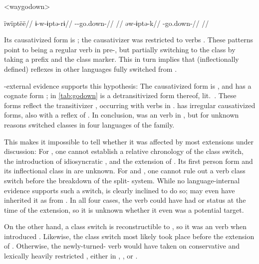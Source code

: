 \pex<waygodown>\wayana \parencite[][200]{wayanatavares2005}
\begin{multicols}{2}
\begingl
\glpreamble ïwïptëë//
\gla ɨ-w-ɨptə-rɨ//
\glb {}--go.down-//
\glft {}//
\endgl
{}
\begingl
\gla əw-ɨptə-k//
\glb {}-go.down-//
\glft {}//
\endgl
\end{multicols}
\xe
%
Its causativized form is  \parencite[255]{wayanatavares2005}; the \PC  causativizer  was restricted to  verbs \parencite{gildea2019overview}.
These patterns point to  being a regular  verb in pre-\wayana, but partially switching to the  class by taking a  prefix and the  class marker.
This in turn implies that (inflectionally defined)  reflexes in other languages fully switched from .

\wayana-external evidence supports this hypothesis:
The \arara causativized form is  \parencite[66]{alves2017arara}, and \kalina has a cognate form  \parencite[263]{courtz2008carib};   in \cref{tab:godown} is a detransitivized form thereof, lit.\ .
These forms reflect the transitivizer , occurring with  verbs in \PC \parencite{gildea2019overview}.
\trio {} has irregular causativized forms, also with a reflex of  \parencite[263]{triomeira1999}.
In conclusion,   was an  verb in \PC, but for unknown reasons switched classes in four  languages of the family.

This makes it impossible to tell whether it was affected by most extensions under discussion:
For \PTir, one cannot establish a relative chronology of the class switch, the introduction of idiosyncratic  , and the extension of .
Its first person form and its inflectional class in \PWai are unknown.
For \carijo and \yukpa, one cannot rule out a verb class switch before the breakdown of the split- system.
While no language-internal evidence supports such a switch,  is clearly inclined to do so; \carijo may even have inherited it as  from \PTar.
In all four cases, the verb could have had  or  status at the time of the extension, so it is unknown whether it even was a potential target.

On the other hand, a class switch is reconstructible to \PTir, so it was an  verb when \akuriyo introduced .
Likewise, the class switch most likely took place before the extension of \PPek {}.
Otherwise, the newly-turned- verb would have taken on conservative and lexically heavily restricted , either in \PPek, \PXin, or \arara.

